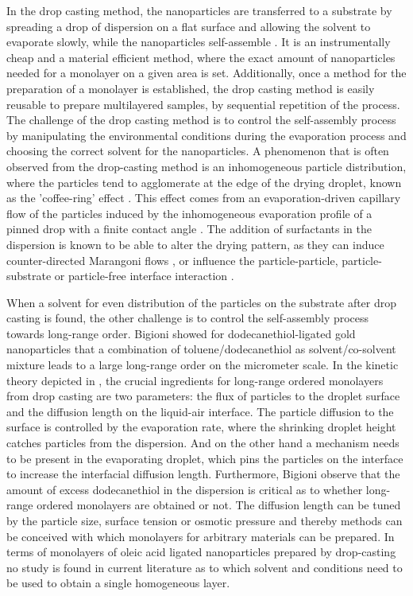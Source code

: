 \documentclass[\main/dresen_thesis.tex]{subfiles}
\begin{document}
  In the drop casting method, the nanoparticles are transferred to a substrate by spreading a drop of dispersion on a flat surface and allowing the solvent to evaporate slowly, while the nanoparticles self-assemble \cite{Han_2012_Learn}.
  It is an instrumentally cheap and a material efficient method, where the exact amount of nanoparticles needed for a monolayer on a given area is set.
  Additionally, once a method for the preparation of a monolayer is established, the drop casting method is easily reusable to prepare multilayered samples, by sequential repetition of the process.
  The challenge of the drop casting method is to control the self-assembly process by manipulating the environmental conditions during the evaporation process and choosing the correct solvent for the nanoparticles.
  A phenomenon that is often observed from the drop-casting method is an inhomogeneous particle distribution, where the particles tend to agglomerate at the edge of the drying droplet, known as the 'coffee-ring' effect \cite{Deegan_1997_Capil, Anyfantakis_2015_Modul, Dugyala_2014_Contr}.
  This effect comes from an evaporation-driven capillary flow of the particles induced by the inhomogeneous evaporation profile of a pinned drop with a finite contact angle \cite{Deegan_1997_Capil}.
  The addition of surfactants in the dispersion is known to be able to alter the drying pattern, as they can induce counter-directed Marangoni flows \cite{Kajiya_2009_Contr}, or influence the particle-particle, particle-substrate or particle-free interface interaction \cite{Anyfantakis_2015_Modul}.

  When a solvent for even distribution of the particles on the substrate after drop casting is found, the other challenge is to control the self-assembly process towards long-range order.
  Bigioni \etal \cite{Bigioni_2006_Kinet} showed for dodecanethiol-ligated gold nanoparticles that a combination of toluene/dodecanethiol as solvent/co-solvent mixture leads to a large long-range order on the micrometer scale.
  In the kinetic theory depicted in , the crucial ingredients for long-range ordered monolayers from drop casting are two parameters: the flux of particles to the droplet surface and the diffusion length on the liquid-air interface.
  The particle diffusion to the surface is controlled by the evaporation rate, where the shrinking droplet height catches particles from the dispersion.
  And on the other hand a mechanism needs to be present in the evaporating droplet, which pins the particles on the interface to increase the interfacial diffusion length.
  Furthermore, Bigioni \etal \cite{Bigioni_2006_Kinet} observe that the amount of excess dodecanethiol in the dispersion is critical as to whether long-range ordered monolayers are obtained or not.
  The diffusion length can be tuned by the particle size, surface tension or osmotic pressure and thereby methods can be conceived with which monolayers for arbitrary materials can be prepared.
  In terms of monolayers of oleic acid ligated nanoparticles prepared by drop-casting no study is found in current literature as to which solvent and conditions need to be used to obtain a single homogeneous layer.
\end{document}
